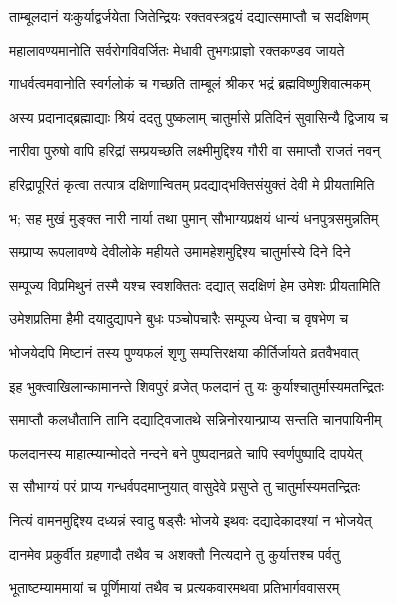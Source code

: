 \twolineshloka
{ताम्बूलदानं यःकुर्याद्वर्जयेता जितेन्द्रियः}
{रक्तवस्त्रद्वयं दद्यात्समाप्तौ च सदक्षिणम्} %

\twolineshloka
{महालावण्यमानोति सर्वरोगविवर्जितः}
{मेधावी तुभगःप्राज्ञो रक्तकण्डव जायते} %

\twolineshloka
{गाधर्वत्वमवानोति स्वर्गलोकं च गच्छति}
{ताम्बूलं श्रीकर भद्रं ब्रह्मविष्णुशिवात्मकम्} %

\twolineshloka
{अस्य प्रदानाद्ब्रह्माद्याः श्रियं ददतु पुष्कलाम्}
{चातुर्मासे प्रतिदिनं सुवासिन्यै द्विजाय च} %

\twolineshloka
{नारीवा पुरुषो वापि हरिद्रां सम्प्रयच्छति}
{लक्ष्मीमुद्दिश्य गौरी वा समाप्तौ राजतं नवन्} %

\twolineshloka
{हरिद्रापूरितं कृत्वा तत्पात्र दक्षिणान्वितम्}
{प्रदद्याद्भक्तिसंयुक्तं देवी मे प्रीयतामिति} %

\twolineshloka
{भ; सह मुखं मुङ्क्त नारी नार्या तथा पुमान्}
{सौभाग्यप्रक्षयं धान्यं धनपुत्रसमुन्नतिम्} %

\twolineshloka
{सम्प्राप्य रूपलावण्ये देवीलोके महीयते}
{उमामहेशमुद्दिश्य चातुर्मास्ये दिने दिने} %

\twolineshloka
{सम्पूज्य विप्रमिथुनं तस्मै यश्च स्वशक्तितः}
{दद्यात् सदक्षिणं हेम उमेशः प्रीयतामिति} %

\twolineshloka
{उमेशप्रतिमा हैमी दयादुद्यापने बुधः}
{पञ्चोपचारैः सम्पूज्य धेन्वा च वृषभेण च} %

\twolineshloka
{भोजयेदपि मिष्टानं तस्य पुण्यफलं शृणु}
{सम्पत्तिरक्षया कीर्तिर्जायते व्रतवैभवात्} %

\twolineshloka
{इह भुक्त्वाखिलान्कामानन्ते शिवपुरं व्रजेत्}
{फलदानं तु यः कुर्याश्चातुर्मास्यमतन्द्रितः} %

\twolineshloka
{समाप्तौ कलधौतानि तानि दद्याट्विजातथे}
{सन्निनोरयान्प्राप्य सन्तति चानपायिनीम्} %

\twolineshloka
{फलदानस्य माहात्म्यान्मोदते नन्दने बने}
{पुष्पदानव्रते चापि स्वर्णपुष्पादि दापयेत्} %

\twolineshloka
{स सौभाग्यं परं प्राप्य गन्धर्वपदमाप्नुयात्}
{वासुदेवे प्रसुप्ते तु चातुर्मास्यमतन्द्रितः} %

\twolineshloka
{नित्यं वामनमुद्दिश्य दध्यन्नं स्वादु षड्सैः}
{भोजये इथवः दद्यादेकादश्यां न भोजयेत्} %

\twolineshloka
{दानमेव प्रकुर्वीत ग्रहणादौ तथैव च}
{अशक्तौ नित्यदाने तु कुर्यात्तश्च पर्वतु} %

\twolineshloka
{भूताष्टम्याममायां च पूर्णिमायां तथैव च}
{प्रत्यकवारमथवा प्रतिभार्गववासरम्} %

